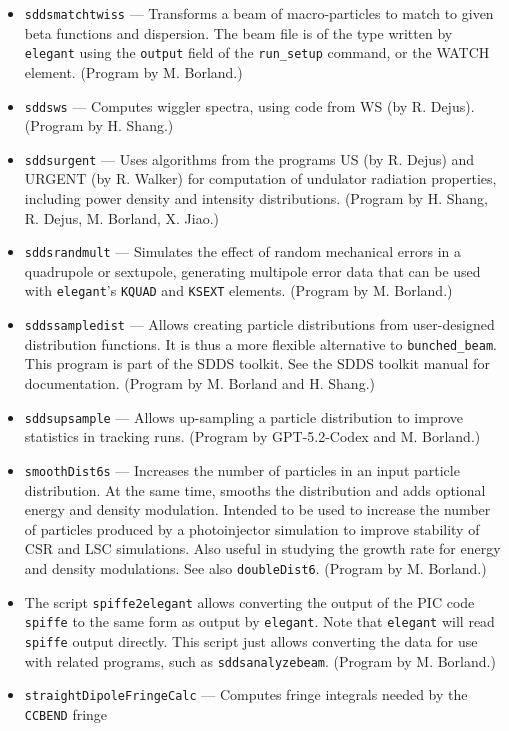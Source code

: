 \documentclass[11pt]{article}
\begin{document}
\begin{itemize}
\item {\tt sddsmatchtwiss} --- Transforms a beam of macro-particles to match to given beta
        functions and dispersion.    The beam file
        is of the type written by {\tt elegant} using the {\tt output} field of the {\tt run\_setup}
        command, or the WATCH element. (Program by M. Borland.)
\item {\tt sddsws} --- Computes wiggler spectra, using code from WS (by R. Dejus).
  (Program by H. Shang.)
\item {\tt sddsurgent} --- Uses algorithms from the programs US (by R. Dejus) and URGENT (by R. Walker) for computation of undulator
  radiation properties, including power density and intensity distributions.  (Program by H. Shang, R. Dejus, M. Borland, X. Jiao.)
\item {\tt sddsrandmult} --- Simulates the effect of random mechanical errors in a quadrupole or sextupole,
  generating multipole error data that can be used with {\tt elegant}'s {\tt KQUAD} and {\tt KSEXT}
  elements. (Program by M. Borland.)
\item {\tt sddssampledist} --- Allows creating particle
        distributions from user-designed distribution functions.  It is thus a more flexible alternative
        to \verb|bunched_beam|.  This program is part of the SDDS toolkit.  See the SDDS toolkit
        manual for documentation.  (Program by M. Borland and H. Shang.)
\item {\tt sddsupsample} --- Allows up-sampling a particle distribution to improve statistics in tracking runs. (Program by GPT-5.2-Codex and M. Borland.)
\item {\tt smoothDist6s} --- Increases the number of particles in an input particle distribution.  At the same
 time, smooths the distribution and adds optional energy and density modulation.   Intended to be used to increase the number of particles
 produced by a photoinjector simulation to improve stability of CSR and LSC simulations.  Also useful in studying 
 the growth rate for energy and density modulations.  See also {\tt doubleDist6}.
  (Program by M. Borland.)
\item The script \verb|spiffe2elegant| allows converting the output of the PIC code \verb|spiffe| to the same form
  as output by \verb|elegant|.  Note that \verb|elegant| will read \verb|spiffe| output directly. This script just allows converting the
  data for use with related programs, such as \verb|sddsanalyzebeam|.
  (Program by M. Borland.)
\item {\tt straightDipoleFringeCalc} --- Computes fringe integrals needed by the \verb|CCBEND| fringe

\end{itemize}
\end{document}

